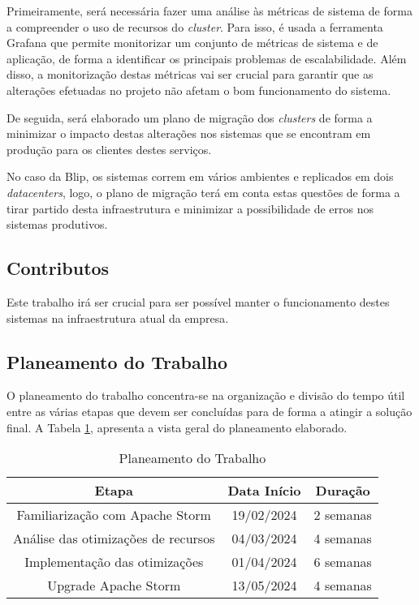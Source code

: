 Primeiramente, será necessária fazer uma análise às métricas de sistema de forma a compreender
o uso de recursos do \textit{cluster}. Para isso, é usada a ferramenta Grafana que permite
monitorizar um conjunto de métricas de sistema e de aplicação, de forma a identificar os principais
problemas de escalabilidade. Além disso, a monitorização destas métricas vai ser crucial para
garantir que as alterações efetuadas no projeto não afetam o bom funcionamento do sistema.

De seguida, será elaborado um plano de migração dos \textit{clusters} de forma a minimizar o 
impacto destas alterações nos sistemas que se encontram em produção para os clientes destes serviços.

No caso da Blip, os sistemas correm em vários ambientes e replicados em dois \textit{datacenters},
logo, o plano de migração terá em conta estas questões de forma a tirar partido desta infraestrutura
e minimizar a possibilidade de erros nos sistemas produtivos.

\subsection{Contributos}

Este trabalho irá ser crucial para ser possível manter o funcionamento destes sistemas na
infraestrutura atual da empresa.


\subsection{Planeamento do Trabalho}

O planeamento do trabalho concentra-se na organização e divisão do tempo útil entre as várias etapas
que devem ser concluídas para de forma a atingir a solução final. A Tabela \ref{tab:plan}, apresenta 
a vista geral do planeamento elaborado.

\begin{table}[H]
  \begin{center}
    \caption{Planeamento do Trabalho}
    \vspace{5mm}
    \label{tab:plan}
    \begin{tabular}{|c|c|c|}
      \hline
      \textbf{Etapa} & \textbf{Data Início} & \textbf{Duração} \\ \hline
      Familiarização com Apache Storm  & 19/02/2024 & 2 semanas \\ \hline
      Análise das otimizações de recursos & 04/03/2024 & 4 semanas \\ \hline
      Implementação das otimizações & 01/04/2024 & 6 semanas \\ \hline
      Upgrade Apache Storm & 13/05/2024 & 4 semanas \\ \hline
    \end{tabular}
  \end{center}
\end{table}

